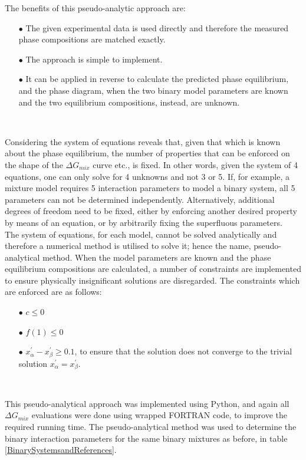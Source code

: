 The benefits of this pseudo-analytic approach are:\

\begin{itemize}
\item[$\bullet$] The given experimental data is used directly and therefore the measured phase compositions are matched exactly.\
\item[$\bullet$] The approach is simple to implement.\
\item[$\bullet$] It can be applied in reverse to calculate the predicted phase equilibrium, and the phase diagram, when the two binary model parameters are known and the two equilibrium compositions, instead, are unknown.\
\end{itemize}\

Considering the system of equations reveals that, given that which is known about the phase equilibrium, the number of properties that can be enforced on the shape of the $\Delta G_{mix}$ curve etc., is fixed. In other words, given the system of 4 equations, one can only solve for 4 unknowns and not 3 or 5. If, for example, a mixture model requires 5 interaction parameters to model a binary system, all 5 parameters can not be determined independently. Alternatively, additional degrees of freedom need to be fixed, either by enforcing another desired property by means of an equation, or by arbitrarily fixing the superfluous parameters.\\

The system of equations, for each model, cannot be solved analytically and therefore a numerical method is utilised to solve it; hence the name, pseudo-analytical method. When the model parameters are known and the phase equilibrium compositions are calculated,  a number of constraints are implemented to ensure physically insignificant solutions are disregarded. The constraints which are enforced are as follows:\

\begin{itemize}
\item[$\bullet$] $c \leq 0$
\item[$\bullet$] $f\left(1\right) \leq 0$
\item[$\bullet$] $x_{\alpha}^{\prime} - x_{\beta}^{\prime} \geq 0.1$, to ensure that the solution does not converge to the trivial solution $x_{\alpha}^{\prime} = x_{\beta}^{\prime}$.
\end{itemize}\

This pseudo-analytical approach was implemented using Python, and again all $\Delta G_{mix}$ evaluations were done using wrapped FORTRAN code, to improve the required running time. The pseudo-analytical method was used to determine the binary interaction parameters for the same binary mixtures as before, in table \ref{BinarySystemsandReferences}.\\				

